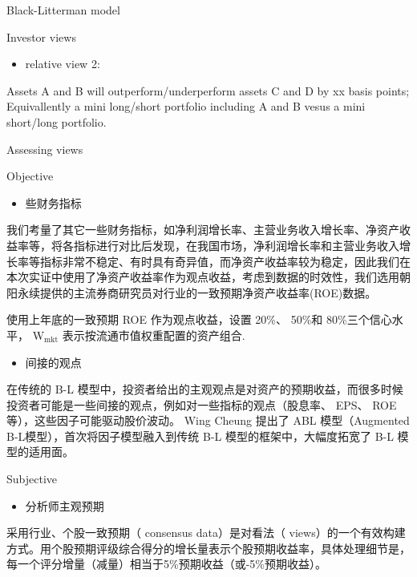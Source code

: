\documentclass[presentation]{beamer}
\begin{document}
\begin{frame}[label={sec:orgheadline24}]{Black-Litterman model}
\begin{block}{Investor views}
\begin{itemize}
\item relative view 2:
\end{itemize}
Assets A and B will outperform/underperform assets C and D by xx basis points; Equivallently a mini long/short portfolio including A and B vesus a mini short/long portfolio.
\begin{block}{Assessing views}
\begin{block}{Objective}
\begin{itemize}
\item 些财务指标
\end{itemize}
我们考量了其它一些财务指标，如净利润增长率、主营业务收入增长率、净资产收益率等，将各指标进行对比后发现，在我国市场，净利润增长率和主营业务收入增长率等指标非常不稳定、有时具有奇异值，而净资产收益率较为稳定，因此我们在本次实证中使用了净资产收益率作为观点收益，考虑到数据的时效性，我们选用朝阳永续提供的主流券商研究员对行业的一致预期净资产收益率(ROE)数据。

使用上年底的一致预期 ROE 作为观点收益，设置 20\%、 50\%和 80\%三个信心水平， W\(_{\text{mkt}}\) 表示按流通市值权重配置的资产组合.

\begin{itemize}
\item 间接的观点
\end{itemize}
在传统的 B-L 模型中，投资者给出的主观观点是对资产的预期收益，而很多时候投资者可能是一些间接的观点，例如对一些指标的观点（股息率、 EPS、 ROE 等），这些因子可能驱动股价波动。 Wing Cheung 提出了 ABL 模型（Augmented B-L模型），首次将因子模型融入到传统 B-L 模型的框架中，大幅度拓宽了 B-L 模型的适用面。
\end{block}
\begin{block}{Subjective}
\begin{itemize}
\item 分析师主观预期
\end{itemize}
采用行业、个股一致预期（ consensus data）是对看法（ views）的一个有效构建方式。用个股预期评级综合得分的增长量表示个股预期收益率，具体处理细节是，每一个评分增量（减量）相当于5\%预期收益（或-5\%预期收益）。
\end{block}
\end{block}
\end{block}
\end{frame}
\end{document}
